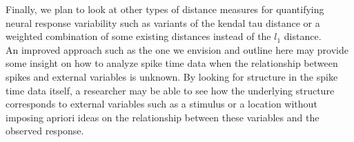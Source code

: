 Finally, we plan to look at other types of distance measures for quantifying neural response variability such as variants of the kendal tau distance  or a weighted combination of some existing distances instead of the $l_1$ distance.\\

An improved approach such as the one we envision and outline here  may provide some insight on how to analyze
spike time data when the relationship between spikes and external variables is unknown.  By looking for structure in the 
spike time data itself,  a researcher may be able to see how the underlying structure corresponds to external variables such as a stimulus  or a location without imposing apriori ideas  on the relationship between these variables and the observed response.
















